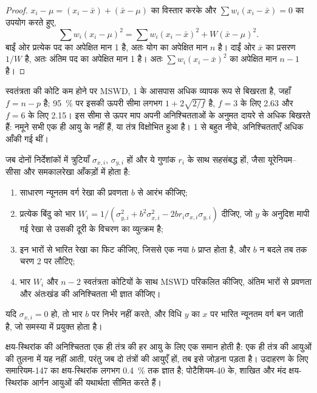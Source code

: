 \begin{proof}
$x_i - \mu = (x_i - \bar x) + (\bar x - \mu)$ का विस्तार करके और $\sum
w_i(x_i - \bar x) = 0$ का उपयोग करते हुए,
\[
\sum w_i(x_i - \mu)^2 = \sum w_i(x_i - \bar x)^2 + W(\bar x - \mu)^2.
\]
बाईं ओर प्रत्येक पद का अपेक्षित मान 1 है, अतः योग का अपेक्षित मान $n$ है।
दाईं ओर $\bar x$ का प्रसरण $1/W$ है, अतः अंतिम पद का अपेक्षित मान 1 है।
अतः $\sum w_i(x_i - \bar x)^2$ का अपेक्षित मान $n - 1$ है।
\end{proof}

स्वतंत्रता की कोटि कम होने पर MSWD, 1 के आसपास अधिक व्यापक रूप से बिखरता है,
जहाँ $f = n - p$ है; \qty{95}{\percent} पर इसकी ऊपरी सीमा लगभग $1 +
2\sqrt{2/f}$ है, $f = 3$ के लिए 2.63 और $f = 6$ के लिए 2.15। इस सीमा से ऊपर
माप अपनी अनिश्चितताओं के अनुमत दायरे से अधिक बिखरते हैं: नमूने
सभी एक ही आयु के नहीं हैं, या तंत्र विक्षोभित हुआ है। 1 से बहुत नीचे,
अनिश्चितताएँ अधिक आँकी गई थीं।

\begin{method}[दोनों अक्षों पर त्रुटियों वाली समकालरेखा का समायोजन]\label{met:b3:advanced-geochronology:york}
जब दोनों निर्देशांकों में त्रुटियाँ $\sigma_{x,i}$, $\sigma_{y,i}$ हों और ये
गुणांक $r_i$ के साथ सहसंबद्ध हों, जैसा यूरेनियम--सीसा और समकालरेखा आँकड़ों में होता है:
\begin{enumerate}
\item साधारण न्यूनतम वर्ग रेखा की प्रवणता $b$ से आरंभ कीजिए;
\item प्रत्येक बिंदु को भार $W_i = 1/(\sigma_{y,i}^2 + b^2\sigma_{x,i}^2 -
2br_i\sigma_{x,i}\sigma_{y,i})$ दीजिए, जो $y$ के अनुदिश मापी गई
रेखा से उसकी दूरी के विचरण का व्युत्क्रम है;
\item इन भारों से भारित रेखा का फिट कीजिए, जिससे एक नया $b$ प्राप्त होता है, और
$b$ न बदले तब तक चरण 2 पर लौटिए;
\item भार $W_i$ और $n - 2$ स्वतंत्रता कोटियों के साथ MSWD परिकलित कीजिए,
अंतिम भारों से प्रवणता और अंतःखंड की अनिश्चितता भी ज्ञात कीजिए।
\end{enumerate}
यदि $\sigma_{x,i} = 0$ हो, तो भार $b$ पर निर्भर नहीं करते, और
विधि $y$ का $x$ पर भारित न्यूनतम वर्ग बन जाती है, जो समस्या में प्रयुक्त होता है।
\end{method}

क्षय-स्थिरांक की अनिश्चितता एक ही तंत्र की हर आयु के लिए एक समान होती है:
एक ही तंत्र की आयुओं की तुलना में यह नहीं आती, परंतु जब
दो तंत्रों की आयुएँ हों, तब इसे जोड़ना पड़ता है। उदाहरण के लिए समारियम-147 का
क्षय-स्थिरांक लगभग \qty{0.4}{\percent} तक ज्ञात है; पोटैशियम-40 के,
शाखित और मंद क्षय-स्थिरांक आर्गन आयुओं की यथार्थता सीमित करते हैं।


